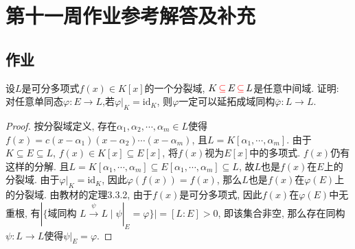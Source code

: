 \documentclass{../solutions-cn}
\begin{document}
\section*{第十一周作业参考解答及补充}

\subsection*{作业}

\begin{exercise}[习题3.3.6]
    设$L$是可分多项式$f(x) \in K[x]$的一个分裂域, $K \,\textcolor{red}{\subseteq}\, E \,\textcolor{red}{\subseteq}\, L$是任意中间域. 证明: 对任意单同态$\varphi:E \to L$,若$\varphi|_K = \mathrm{id}_K$, 则$\varphi$一定可以延拓成域同构$\overline\varphi:L \to L$.
\end{exercise}

\begin{proof}
    按分裂域定义, 存在$\alpha_1, \alpha_2, \cdots, \alpha_m \in L$使得$f(x) = c(x - \alpha_1)(x - \alpha_2) \cdots (x - \alpha_m)$, 且$L = K[\alpha_1, \cdots, \alpha_m]$. 由于$K \subseteq E \subseteq L$, $f(x) \in K[x] \subseteq E[x]$, 将$f(x)$视为$E[x]$中的多项式. $f(x)$仍有这样的分解. 且$L = K[\alpha_1, \cdots, \alpha_m] \subseteq E[\alpha_1, \cdots, \alpha_m] \subseteq L$, 故$L$也是$f(x)$在$E$上的分裂域. 由于$\varphi|_K = \mathrm{id}_K$, 因此$\varphi(f(x)) = f(x)$, 那么$L$也是$f(x)$在$\varphi(E)$上的分裂域. 由教材的定理3.3.2, 由于$f(x)$是可分多项式, 因此$f(x)$在$\varphi(E)$中无重根, 有$|\{\text{域同构 } L \xrightarrow{\psi} L \mid \psi|_E = \varphi\}| = [L:E] > 0$, 即该集合非空, 那么存在同构$\psi:L \to L$使得$\psi|_E = \varphi$.
\end{proof}
\end{document}
